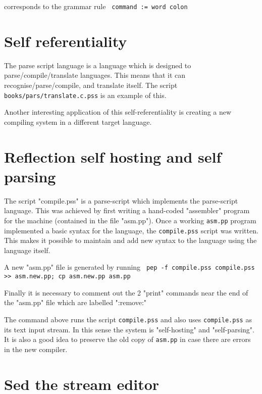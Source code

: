 \documentclass[a4paper,12pt]{article}
\begin{document}
  corresponds to the grammar rule 
 \verb| command := word colon |


\section{Self referentiality}

  The parse script language is a language which is designed to
  parse/compile/translate languages. This means that it can
  recognise/parse/compile, and translate itself. The script
  \texttt{books/pars/translate.c.pss} is an example of this.

  Another interesting application of this self-referentiality
  is creating a new compiling system in a different target language.
    
\section{Reflection self hosting and self parsing}

  The script "compile.pss" is a parse-script which implements the
  parse-script language. This was achieved by first writing a hand-coded
  "assembler" program for the machine (contained in the file "asm.pp").
  Once a working \texttt{asm.pp} program implemented a basic syntax for the language,
  the \texttt{compile.pss} script was written. This makes it possible to maintain and
  add new syntax to the language using the language itself.

  A new "asm.pp" file is generated by running 
 \verb| pep -f compile.pss compile.pss >> asm.new.pp; cp asm.new.pp asm.pp |


  Finally it is necessary to comment out the 2 "print" commands near
  the end of the "asm.pp" file which are labelled ":remove:"

  The command above runs the script \texttt{compile.pss} and also uses \texttt{compile.pss} as
  its text input stream. In this sense the system is "self-hosting" and
  "self-parsing". It is also a good idea to preserve the old copy of \texttt{asm.pp}
  in case there are errors in the new compiler.

\section{Sed the stream editor}
\end{document}
